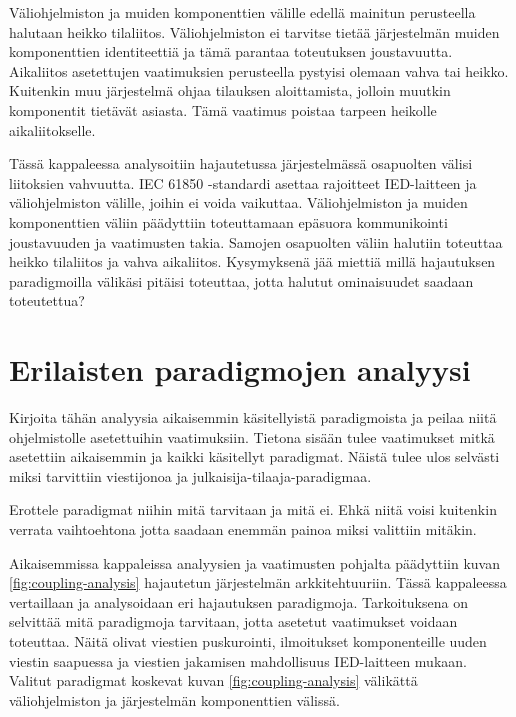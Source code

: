 Väliohjelmiston ja muiden komponenttien välille edellä mainitun perusteella halutaan heikko tilaliitos. Väliohjelmiston ei tarvitse tietää järjestelmän muiden komponenttien identiteettiä ja tämä parantaa toteutuksen joustavuutta. Aikaliitos asetettujen vaatimuksien perusteella pystyisi olemaan vahva tai heikko. Kuitenkin muu järjestelmä ohjaa tilauksen aloittamista, jolloin muutkin komponentit tietävät asiasta. Tämä vaatimus poistaa tarpeen heikolle aikaliitokselle.

Tässä kappaleessa analysoitiin hajautetussa järjestelmässä osapuolten välisi liitoksien vahvuutta. IEC 61850 -standardi asettaa rajoitteet IED-laitteen ja väliohjelmiston välille, joihin ei voida vaikuttaa. Väliohjelmiston ja muiden komponenttien väliin päädyttiin toteuttamaan epäsuora kommunikointi joustavuuden ja vaatimusten takia. Samojen osapuolten väliin halutiin toteuttaa heikko tilaliitos ja vahva aikaliitos. Kysymyksenä jää miettiä millä hajautuksen paradigmoilla välikäsi pitäisi toteuttaa, jotta halutut ominaisuudet saadaan toteutettua?


\section{Erilaisten paradigmojen analyysi}
\begin{it}
	Kirjoita tähän analyysia aikaisemmin käsitellyistä paradigmoista ja peilaa niitä ohjelmistolle asetettuihin vaatimuksiin. Tietona sisään tulee vaatimukset mitkä asetettiin aikaisemmin ja kaikki käsitellyt paradigmat. Näistä tulee ulos selvästi miksi tarvittiin viestijonoa ja julkaisija-tilaaja-paradigmaa.
	
	Erottele paradigmat niihin mitä tarvitaan ja mitä ei. Ehkä niitä voisi kuitenkin verrata vaihtoehtona jotta saadaan enemmän painoa miksi valittiin mitäkin.
\end{it}
Aikaisemmissa kappaleissa analyysien ja vaatimusten pohjalta päädyttiin kuvan \ref{fig:coupling-analysis} hajautetun järjestelmän arkkitehtuuriin. Tässä kappaleessa vertaillaan ja analysoidaan eri hajautuksen paradigmoja. Tarkoituksena on selvittää mitä paradigmoja tarvitaan, jotta asetetut vaatimukset voidaan toteuttaa. Näitä olivat viestien puskurointi, ilmoitukset komponenteille uuden viestin saapuessa ja viestien jakamisen mahdollisuus IED-laitteen mukaan. Valitut paradigmat koskevat kuvan \ref{fig:coupling-analysis} välikättä väliohjelmiston ja järjestelmän komponenttien välissä.


